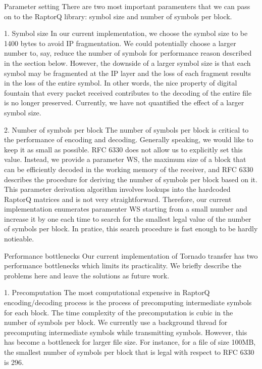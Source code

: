 \documentclass{sig-alternate-10pt}
\begin{document}
Parameter setting
There are two most important paramenters that we can pass on to the RaptorQ library: symbol size and number of symbols per block.

1. Symbol size
In our current implementation, we choose the symbol size to be 1400 bytes to avoid IP fragmentation. We could potentially choose a larger number to, say, reduce the number of symbols for performance reason described in the section below. However, the downside of a larger symbol size is that each symbol may be fragmented at the IP layer and the loss of each fragment results in the loss of the entire symbol. In other words, the nice property of digital fountain that every packet received contributes to the decoding of the entire file is no longer preserved. Currently, we have not quantified the effect of a larger symbol size.

2. Number of symbols per block
The number of symbols per block is critical to the performance of encoding and decoding. Generally speaking, we would like to keep it as small as possible. RFC 6330 does not allow us to explicitly set this value. Instead, we provide a parameter WS, the maximum size of a block that can be efficiently decoded in the working memory of the receiver, and RFC 6330 describes the procedure for deriving the number of symbols per block based on it. This parameter derivation algorithm involves lookups into the hardcoded RaptorQ matrices and is not very straightforward. Therefore, our current implementation enumerates paramenter WS starting from a small number and increase it by one each time to search for the smallest legal value of the number of symbols per block. In pratice, this search procedure is fast enough to be hardly notieable.

Performance bottlenecks
Our current implementation of Tornado transfer has two performance bottlenecks which limits its practicality. We briefly describe the problems here and leave the solutions as future work.

1. Precomputation
The most computational expensive in RaptorQ encoding/decoding process is the process of precomputing intermediate symbols for each block. The time complexity of the precomputation is cubic in the number of symbols per block. We currently use a background thread for precomputing intermediate symbols while transmitting symbols. However, this has become a bottleneck for larger file size. For instance, for a file of size 100MB, the smallest number of symbols per block that is legal with respect to RFC 6330 is 296.
\end{document}
